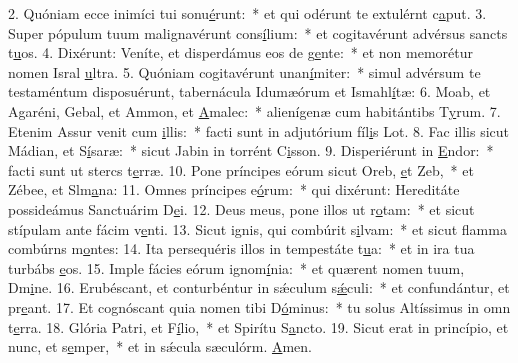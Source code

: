 2. Quóniam ecce inimíci tui sonu\uline{é}runt:~* et qui odérunt te extulérnt c\uline{a}put.
3. Super pópulum tuum malignavérunt cons\uline{í}lium:~* et cogitavérunt advérsus sancts t\uline{u}os.
4. Dixérunt: Veníte, et disperdámus eos de g\uline{e}nte:~* et non memorétur nomen Isral \uline{u}ltra.
5. Quóniam cogitavérunt unan\uline{í}miter:~* simul advérsum te testaméntum disposuérunt, tabernácula Idumæórum et Ismahl\uline{í}tæ:
6. Moab, et Agaréni, Gebal, et Ammon, et \uline{A}malec:~* alienígenæ cum habitántibs T\uline{y}rum.
7. Etenim Assur venit cum \uline{i}llis:~* facti sunt in adjutórium fíl\uline{i}s Lot.
8. Fac illis sicut Mádian, et S\uline{í}saræ:~* sicut Jabin in torrént C\uline{i}sson.
9. Disperiérunt in \uline{E}ndor:~* facti sunt ut stercs t\uline{e}rræ.
10. Pone príncipes eórum sicut Oreb, \uline{e}t Zeb,~* et Zébee, et Slm\uline{a}na:
11. Omnes príncipes e\uline{ó}rum:~* qui dixérunt: Hereditáte possideámus Sanctuárim D\uline{e}i.
12. Deus meus, pone illos ut r\uline{o}tam:~* et sicut stípulam ante fácim v\uline{e}nti.
13. Sicut ignis, qui combúrit s\uline{i}lvam:~* et sicut flamma combúrns m\uline{o}ntes:
14. Ita persequéris illos in tempestáte t\uline{u}a:~* et in ira tua turbábs \uline{e}os.
15. Imple fácies eórum ignom\uline{í}nia:~* et quærent nomen tuum, Dm\uline{i}ne.
16. Erubéscant, et conturbéntur in sǽculum s\uline{ǽ}culi:~* et confundántur, et pr\uline{e}ant.
17. Et cognóscant quia nomen tibi D\uline{ó}minus:~* tu solus Altíssimus in omn t\uline{e}rra.
18. Glória Patri, et F\uline{í}lio,~* et Spirítu S\uline{a}ncto.
19. Sicut erat in princípio, et nunc, et s\uline{e}mper,~* et in sǽcula sæculórm. \uline{A}men.
